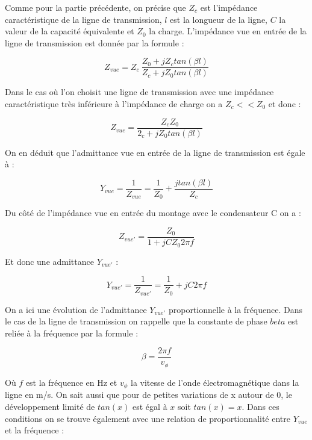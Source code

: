 \documentclass[french]{article}
\begin{document}
Comme pour la partie précédente, on précise que $Z_c$ est l’impédance caractéristique de la ligne de transmission, $l$ est la longueur de la
ligne, $C$ la valeur de la capacité équivalente et $Z_0$ la charge. L’impédance vue en entrée de la ligne de transmission
est donnée par la formule :


\begin{equation}
	Z_{vue} = Z_c\ \frac{Z_0 + j Z_c tan(\beta l)}{Z_c + j Z_0 tan(\beta l)}
\end{equation}

Dans le cas où l'on choisit une ligne de transmission avec une impédance caractéristique très inférieure à l'impédance de charge on a $Z_c<<Z_0$ et donc :

\begin{equation}
	Z_{vue} = \frac{Z_c Z_0}{2_c + j Z_0 tan(\beta l)}
\end{equation}

On en déduit que l'admittance vue en entrée de la ligne de transmission est égale à :

\begin{equation}
	Y_{vue} = \frac{1}{Z_{vue}} = \frac{1}{Z_0} + \frac{j tan(\beta l)}{Z_c}
\end{equation}

Du côté de l'impédance vue en entrée du montage avec le condensateur C on a :

\begin{equation}
	Z_{vue'} = \frac{Z_0}{1 + j C Z_0 2 \pi f}
\end{equation}


Et donc une admittance $Y_{vue'}$ :

\begin{equation}
	Y_{vue'} =  \frac{1}{Z_{vue'}} = \frac{1}{Z_0} + j C 2 \pi f
	\label{eq:YvueC1}
\end{equation}


On a ici une évolution de l'admittance $Y_{vue'}$ proportionnelle à la fréquence. Dans le cas de la ligne de transmission on rappelle que la constante de phase $beta$ est reliée à la fréquence par la formule :

\begin{equation}
	\beta = \frac{2 \pi f}{v_\phi}
\end{equation}


Où $f$ est la fréquence en Hz et $v_\phi$ la vitesse de l'onde électromagnétique dans la ligne en m/s. On sait aussi que pour de petites variations de x autour de 0, le développement limité de $tan(x)$ est égal à $x$ soit $tan(x)=x$. Dans ces conditions on se trouve également avec une relation de proportionnalité entre $Y_{vue}$ et la fréquence :
\end{document}
